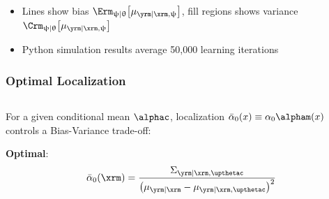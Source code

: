 \documentclass[aspectratio=169]{beamer}
\begin{document}
\begin{frame}
\begin{columns}[c]
\begin{column}{.5\linewidth}
\end{column}

\end{columns}

\vspace{-1em}
\begin{itemize}
\item Lines show bias $\Erm_{\uppsi | \uptheta}\big[\mu_{\yrm | \xrm, \uppsi}\big]$, fill regions shows variance $\Crm_{\uppsi | \uptheta}\big[\mu_{\yrm | \xrm, \uppsi}\big]$
\item Python simulation results average 50,000 learning iterations
\end{itemize}

\end{frame}




\begin{frame}
\frametitle{Optimal Localization}

\begin{columns}[c]

\begin{column}{.5\linewidth}

For a given conditional mean $\alphac$, localization $\bar{\alpha}_0(x) \equiv \alpha_0 \alpham(x)$ controls a \alert{Bias-Variance} trade-off:
\vspace{-1em}
\begin{table}
\renewcommand{\arraystretch}{1.8}
\end{table}

\vspace{.5em}
\textbf{Optimal}: 
\vspace{-.5em}
\begin{equation*} \label{eq:alpha_x_min_Rex}
	\bar{\alpha}_0(\xrm) = \frac{\Sigma_{\yrm | \xrm,\upthetac}}{\left( \mu_{\yrm | \xrm} - \mu_{\yrm | \xrm,\upthetac} \right)^2}
\end{equation*}

\end{column}


\end{columns}
\end{frame}
\end{document}
